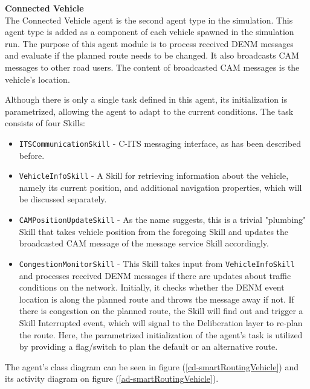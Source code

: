 \documentclass[main.tex]{subfiles}
\begin{document}
\textbf{Connected Vehicle} \smallskip \\
The Connected Vehicle agent is the second agent type in the simulation. This agent type is 
added as a component of each vehicle spawned in the simulation run. The purpose of this 
agent module is to process received DENM messages and evaluate if the planned route needs 
to be changed. It also broadcasts CAM messages to other road users. The content of 
broadcasted CAM messages is the vehicle's location.

Although there is only a single task defined in this agent, its initialization is 
parametrized, allowing the agent to adapt to the current conditions. The task consists of 
four Skills:

\begin{itemize}
    \item \texttt{ITSCommunicationSkill} - C-ITS messaging interface, as has been described before.
    \item \texttt{VehicleInfoSkill} - A Skill for retrieving information about the vehicle, namely 
    its current position, and additional navigation properties, which will be discussed separately.
    \item \texttt{CAMPositionUpdateSkill} - As the name suggests, this is a trivial "plumbing" Skill 
    that takes vehicle position from the foregoing Skill and updates the broadcasted CAM message of 
    the message service Skill accordingly.
    \item \texttt{CongestionMonitorSkill} - This Skill takes input from \texttt{VehicleInfoSkill} and 
    processes received DENM messages if there are updates about traffic conditions on the network. 
    Initially, it checks whether the DENM event location is along the planned route and throws the 
    message away if not. If there is congestion on the planned route, the Skill will find out and 
    trigger a Skill Interrupted event, which will signal to the Deliberation layer to re-plan the route. 
    Here, the parametrized initialization of the agent's task is utilized by providing a flag/switch to 
    plan the default or an alternative route. 
\end{itemize}

The agent's class diagram can be seen in figure (\ref{cd-smartRoutingVehicle}) and its activity diagram 
on figure (\ref{ad-smartRoutingVehicle}).
\end{document}
